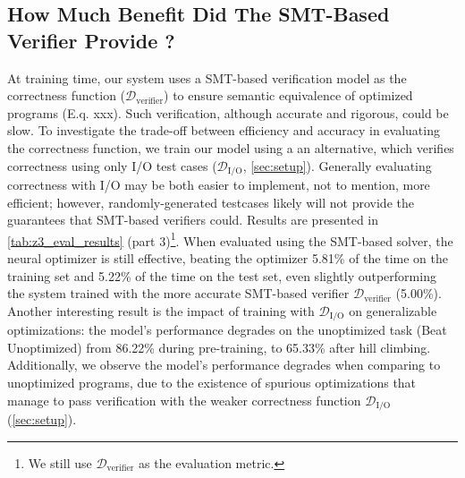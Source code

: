 \documentclass{article}
\def\correctfuncio/{\ensuremath{\mathcal{D}_\textrm{I/O}}}
\def\correctfuncsmt/{\ensuremath{\mathcal{D}_\textrm{verifier}}}
\begin{document}
\subsection{How Much Benefit Did The SMT-Based Verifier Provide ?}
At training time, our system uses a SMT-based verification model as the correctness function (\correctfuncsmt/) to ensure semantic equivalence of optimized programs (E.q. xxx).
Such verification, although accurate and rigorous, could be slow. 
To investigate the trade-off between efficiency and accuracy in evaluating the correctness function, we train our model using a an alternative, which verifies correctness using only I/O test cases (\correctfuncio/, \cref{sec:setup}). Generally evaluating correctness with I/O may be both easier to implement, not to mention, more efficient; however, randomly-generated testcases likely will not provide the guarantees that SMT-based verifiers could. 
Results are presented in \cref{tab:z3_eval_results} (part 3)\footnote{We still use $\correctfuncsmt/$ as the evaluation metric.}.
When evaluated using the SMT-based solver, the neural optimizer is still effective, beating the optimizer 5.81\% of the time on the training set and 5.22\% of the time on the test set, even slightly outperforming the system trained with the more accurate SMT-based verifier $\correctfuncsmt/$ (5.00\%). 
Another interesting result is the impact of training with \correctfuncio/ on generalizable optimizations: the model's performance degrades on the unoptimized task (Beat Unoptimized) from 86.22\% during pre-training, to 65.33\% after hill climbing. 
Additionally, we observe the model's performance degrades when comparing to unoptimized programs, due to the existence of spurious optimizations that manage to pass verification with the weaker correctness function $\correctfuncio/$ (\cref{sec:setup}).
\end{document}
